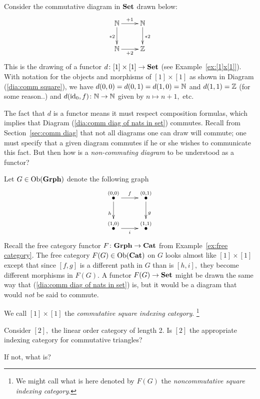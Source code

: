 \documentclass[../main/CT4S-EN-RU]{subfiles}
\begin{document}
\begin{exampleENG}\label{ex:comm vs noncomm diags}
Consider the commutative diagram in ${\mathbf{Set}}$ drawn below:
\begin{align}\label{dia:comm diag of nats in set}
\xymatrix{\NN\ar[r]^{+1}\ar[d]_{*2}&\NN\ar[d]^{*2}\\\NN\ar[r]_{+2}&\ZZ}
\end{align}
This is the drawing of a functor $d\colon[1]\times[1]\rightarrow{\mathbf{Set}}$ (see Example~\ref{ex:[1]x[1]}). With notation for the objects and morphisms of $[1]\times[1]$ as shown in Diagram (\ref{dia:comm square}), we have $d(0,0)=d(0,1)=d(1,0)={\mathbb N}$ and $d(1,1)={\mathbb Z}$ (for some reason..) and $d(\operatorname{id}_0,f)\colon{\mathbb N}\rightarrow{\mathbb N}$ given by $n\mapsto n+1,$ etc. 

The fact that $d$ is a functor means it must respect composition formulas, which implies that Diagram (\ref{dia:comm diag of nats in set}) commutes. Recall from Section~\ref{sec:comm diag} that not all diagrams one can draw will commute; one must specify that a given diagram commutes if he or she wishes to communicate this fact. But then how is a {\em non-commuting diagram} to be understood as a functor?

Let $G\in\operatorname{Ob}({\mathbf{Grph}})$ denote the following graph 
$$\xymatrix{\LMO{(0,0)}\ar[r]^f\ar[d]_h&\LMO{(0,1)}\ar[d]^{g}\\\LMO{(1,0)}\ar[r]_{i}&\LMO{(1,1)}}$$
Recall the free category functor $F\colon{\mathbf{Grph}}\rightarrow{\mathbf{Cat}}$ from Example~\ref{ex:free category}. The free category $F(G)\in\operatorname{Ob}({\mathbf{Cat}})$ on $G$ looks almost like $[1]\times[1]$ except that since $[f,g]$ is a different path in $G$ than is $[h,i],$ they become different morphisms in $F(G).$ A functor $F(G)\rightarrow{\mathbf{Set}}$ might be drawn the same way that (\ref{dia:comm diag of nats in set}) is, but it would be a diagram that would {\em not} be said to commute.

We call $[1]\times [1]$ the {\em commutative square indexing category}. 
\footnote{We might call what is here denoted by $F(G)$ the {\em noncommutative square indexing category}.}
\end{exampleENG}

\begin{exampleRUS}\label{ex:comm vs noncomm diags}
\end{exampleRUS}

\begin{exerciseENG}
Consider $[2],$ the linear order category of length 2.
\sexc Is $[2]$ the appropriate indexing category for commutative triangles?
\item If not, what is?
\endsexc
\end{exerciseENG}
\end{document}
